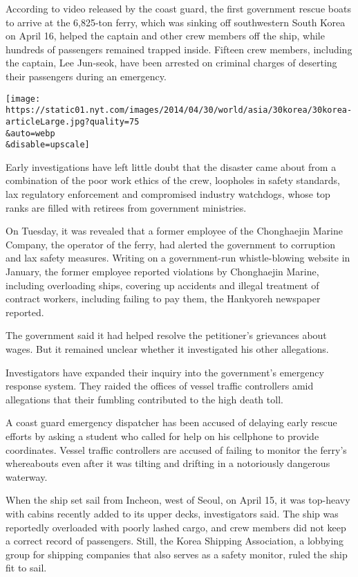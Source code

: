 According to video released by the coast guard, the first government
rescue boats to arrive at the 6,825-ton ferry, which was sinking off
southwestern South Korea on April 16, helped the captain and other crew
members off the ship, while hundreds of passengers remained trapped
inside. Fifteen crew members, including the captain, Lee Jun-seok, have
been arrested on criminal charges of deserting their passengers during
an emergency.

\texttt{[image: https://static01.nyt.com/images/2014/04/30/world/asia/30korea/30korea-articleLarge.jpg?quality=75\\\&auto=webp\\\&disable=upscale]}

Early investigations have left little doubt that the disaster came about
from a combination of the poor work ethics of the crew, loopholes in
safety standards, lax regulatory enforcement and compromised industry
watchdogs, whose top ranks are filled with retirees from government
ministries.

On Tuesday, it was revealed that a former employee of the Chonghaejin
Marine Company, the operator of the ferry, had alerted the government to
corruption and lax safety measures. Writing on a government-run
whistle-blowing website in January, the former employee reported
violations by Chonghaejin Marine, including overloading ships, covering
up accidents and illegal treatment of contract workers, including
failing to pay them, the Hankyoreh newspaper reported.

The government said it had helped resolve the petitioner's grievances
about wages. But it remained unclear whether it investigated his other
allegations.

Investigators have expanded their inquiry into the government's
emergency response system. They raided the offices of vessel traffic
controllers amid allegations that their fumbling contributed to the high
death toll.

A coast guard emergency dispatcher has been accused of delaying early
rescue efforts by asking a student who called for help on his cellphone
to provide coordinates. Vessel traffic controllers are accused of
failing to monitor the ferry's whereabouts even after it was tilting and
drifting in a notoriously dangerous waterway.

When the ship set sail from Incheon, west of Seoul, on April 15, it was
top-heavy with cabins recently added to its upper decks, investigators
said. The ship was reportedly overloaded with poorly lashed cargo, and
crew members did not keep a correct record of passengers. Still, the
Korea Shipping Association, a lobbying group for shipping companies that
also serves as a safety monitor, ruled the ship fit to sail.

